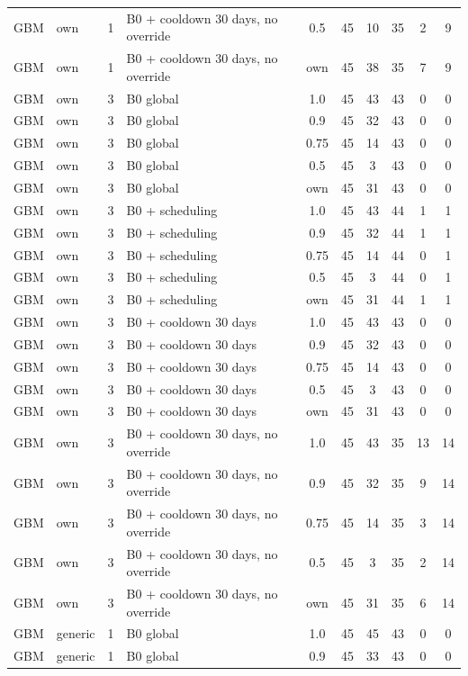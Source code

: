 \documentclass[10pt,onecolumn,letterpaper]{article}
\begin{document}
\begin{longtable}{lllp{4.4cm}cccccc}
GBM & own & 1 & B0 + cooldown 30 days, no override & 0.5 & 45 & 10 & 35 & 2 & 9 \\
GBM & own & 1 & B0 + cooldown 30 days, no override & own & 45 & 38 & 35 & 7 & 9 \\
GBM & own & 3 & B0 global & 1.0 & 45 & 43 & 43 & 0 & 0 \\
GBM & own & 3 & B0 global & 0.9 & 45 & 32 & 43 & 0 & 0 \\
GBM & own & 3 & B0 global & 0.75 & 45 & 14 & 43 & 0 & 0 \\
GBM & own & 3 & B0 global & 0.5 & 45 & 3 & 43 & 0 & 0 \\
GBM & own & 3 & B0 global & own & 45 & 31 & 43 & 0 & 0 \\
GBM & own & 3 & B0 + scheduling & 1.0 & 45 & 43 & 44 & 1 & 1 \\
GBM & own & 3 & B0 + scheduling & 0.9 & 45 & 32 & 44 & 1 & 1 \\
GBM & own & 3 & B0 + scheduling & 0.75 & 45 & 14 & 44 & 0 & 1 \\
GBM & own & 3 & B0 + scheduling & 0.5 & 45 & 3 & 44 & 0 & 1 \\
GBM & own & 3 & B0 + scheduling & own & 45 & 31 & 44 & 1 & 1 \\
GBM & own & 3 & B0 + cooldown 30 days & 1.0 & 45 & 43 & 43 & 0 & 0 \\
GBM & own & 3 & B0 + cooldown 30 days & 0.9 & 45 & 32 & 43 & 0 & 0 \\
GBM & own & 3 & B0 + cooldown 30 days & 0.75 & 45 & 14 & 43 & 0 & 0 \\
GBM & own & 3 & B0 + cooldown 30 days & 0.5 & 45 & 3 & 43 & 0 & 0 \\
GBM & own & 3 & B0 + cooldown 30 days & own & 45 & 31 & 43 & 0 & 0 \\
GBM & own & 3 & B0 + cooldown 30 days, no override & 1.0 & 45 & 43 & 35 & 13 & 14 \\
GBM & own & 3 & B0 + cooldown 30 days, no override & 0.9 & 45 & 32 & 35 & 9 & 14 \\
GBM & own & 3 & B0 + cooldown 30 days, no override & 0.75 & 45 & 14 & 35 & 3 & 14 \\
GBM & own & 3 & B0 + cooldown 30 days, no override & 0.5 & 45 & 3 & 35 & 2 & 14 \\
GBM & own & 3 & B0 + cooldown 30 days, no override & own & 45 & 31 & 35 & 6 & 14 \\
GBM & generic & 1 & B0 global & 1.0 & 45 & 45 & 43 & 0 & 0 \\
GBM & generic & 1 & B0 global & 0.9 & 45 & 33 & 43 & 0 & 0 \\

\end{longtable}
\end{document}
